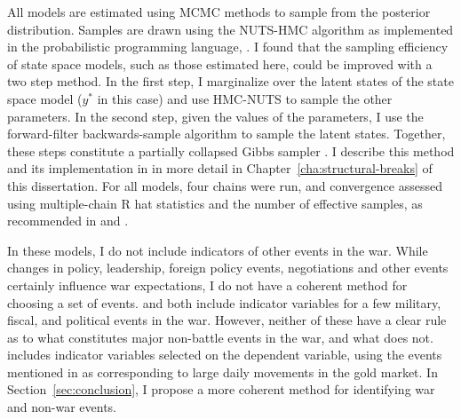 All models are estimated using MCMC methods to sample from the posterior distribution.
Samples are drawn using the NUTS-HMC algorithm \parencite{HoffmanGelman2014a} as implemented in the probabilistic programming language, \Stan{} \parencites{Stan2015a}.
I found that the sampling efficiency of state space models, such as those estimated here, could be improved with a two step method.
In the first step, I marginalize over the latent states of the state space model ($y^{*}$ in this case) and use HMC-NUTS to sample the other parameters.
In the second step, given the values of the parameters, I use the forward-filter backwards-sample algorithm \parencites{Fruehwirth-Schnatter1994}{CarterKohn1994} to sample the latent states.
Together, these steps constitute a partially collapsed Gibbs sampler \parencite{VanDykPark2008a}.
I describe this method and its implementation in \Stan{} in more detail in Chapter~\ref{cha:structural-breaks} of this dissertation.
For all models, four chains were run, and convergence assessed using multiple-chain R hat statistics and the number of effective samples, as recommended in \parencites{Stan2015a} and \textcite{GelmanCarlinSternEtAl2013a}.

In these models, I do not include indicators of other events in the war.
While changes in policy, leadership, foreign policy events, negotiations and other events certainly influence war expectations, I do not have a coherent method for choosing a set of events.
\textcite{McCandless1996} and \textcite{SmithSmith1997} both include indicator variables for a few military, fiscal, and political events in the war.
However, neither of these have a clear rule as to what constitutes major non-battle events in the war, and what does not.
\textcite{SmithSmith1997} includes indicator variables selected on the dependent variable, using the events mentioned in \textcite{Mitchell1903} as corresponding to large daily movements in the gold market.%
In Section~\ref{sec:conclusion}, I propose a more coherent method for identifying war and non-war events.

